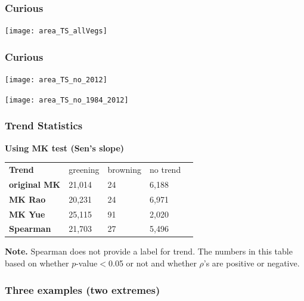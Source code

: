 \documentclass[serif, xcolor={dvipsnames}]{beamer} %
\begin{document}
\begin{frame}
 \frametitle{Curious}
\texttt{[image: area\_TS\_allVegs]}~%
\end{frame}
\begin{frame}
 \frametitle{Curious}
{\hspace*{-5mm}}
\begin{minipage}{.5\textwidth}
\texttt{[image: area\_TS\_no\_2012]}~%
\end{minipage}%
\hspace{.21cm}
\begin{minipage}{.5\textwidth}
\texttt{[image: area\_TS\_no\_1984\_2012]}~%
\end{minipage}
\end{frame}
\fi
\begin{frame}
\frametitle{Trend Statistics}

{\bf Using MK test (Sen's slope)}

\begin{table}[!ht]
\centering
\captionsetup{singlelinecheck=false, format=hang}
\label{tab:Trendcounts}
\begin{tabular}{lllll}
\bottomrule
\rowcolor{shadecolor} \textbf{Trend} & 
 greening & browning & no trend \\ 
\textbf{original MK}  & 21,014 & 24 & 6,188 \\
\rowcolor{shadecolor} \textbf{MK Rao}  & 20,231 & 24 & 6,971 \\
\textbf{MK Yue}  &  25,115 & 91 & 2,020 \\
\rowcolor{aliceblue}\textbf{Spearman}  & 21,703 & 27 & 5,496\\
\toprule
\end{tabular}
\end{table}
\begin{tcolorbox}
{\scriptsize{\bf Note.} Spearman does not provide a label for trend. The numbers
in this table based on whether $p$-value$<$0.05 or not and whether $\rho$'s are positive or negative.}
\end{tcolorbox}
\end{frame}
\begin{frame}
\begin{center}
\end{center}
\end{frame}
\begin{frame}
 \frametitle{Three examples (two extremes)}
\begin{center}
\end{center}
\end{frame}
\end{document}

